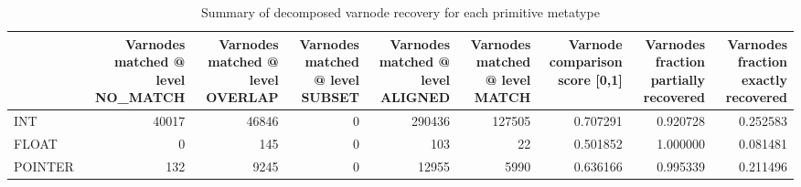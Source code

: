 \begin{table}
\centering
\caption{Summary of decomposed varnode recovery for each primitive metatype}
\label{table:metatype-recovery-summary-with-levels-decomposed}
\begin{tabular}{lrrrrrrrr}
\toprule
{} &  Varnodes matched @ level NO\_MATCH &  Varnodes matched @ level OVERLAP &  Varnodes matched @ level SUBSET &  Varnodes matched @ level ALIGNED &  Varnodes matched @ level MATCH &  Varnode comparison score [0,1] &  Varnodes fraction partially recovered &  Varnodes fraction exactly recovered \\
\midrule
INT     &                              40017 &                             46846 &                                0 &                            290436 &                          127505 &                        0.707291 &                               0.920728 &                             0.252583 \\
FLOAT   &                                  0 &                               145 &                                0 &                               103 &                              22 &                        0.501852 &                               1.000000 &                             0.081481 \\
POINTER &                                132 &                              9245 &                                0 &                             12955 &                            5990 &                        0.636166 &                               0.995339 &                             0.211496 \\
\bottomrule
\end{tabular}
\end{table}
